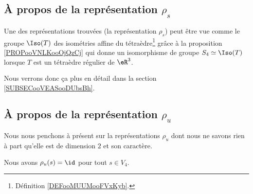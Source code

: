 \subsection{À propos de la représentation \( \rho_s\)}

Une des représentations trouvées (la représentation \( \rho_s\)) peut être vue comme le groupe \( \Iso(T)\) des isométries affine du tétraèdre\footnote{Définition \ref{DEFooMUUMooFVxKyb}.} grâce à la proposition \ref{PROPooVNLKooOjQzCj} qui donne un isomorphisme de groupe \( S_4\simeq \Iso(T)\) lorsque \( T\) est un tétraèdre régulier de \( \eR^3\).

Nous verrons donc ça plus en détail dans la section \ref{SUBSECooVEASooDUbsBh}.

\subsection{À propos de la représentation \( \rho_u\)}

Nous nous penchons à présent sur la représentations \( \rho_u\) dont nous ne savons rien à part qu'elle est de dimension \( 2\) et son caractère.

\begin{lemma}
    Nous avons \( \rho_u(s)=\id\) pour tout \( s\in V_4\).
\end{lemma}

